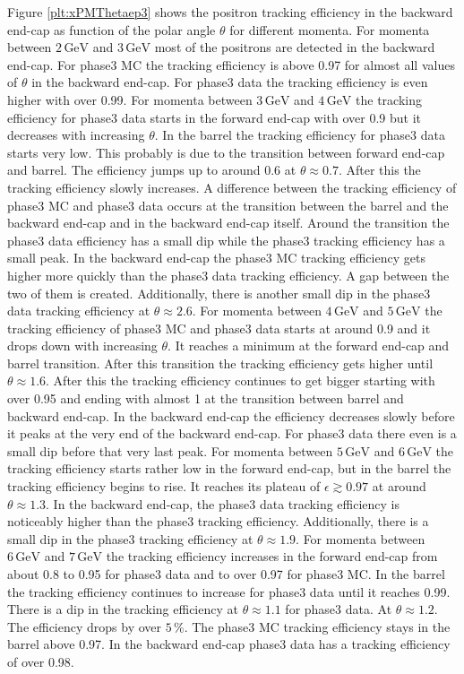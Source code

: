 \documentclass[a4paper,11pt,twosided,final,german,openbib,pdftex,listof=totoc,bibliography=totoc]{scrbook}
\begin{document}
Figure \ref{plt:xPMThetaep3} shows the positron tracking efficiency in the backward end-cap as function of the polar angle $\theta$ for different momenta.
For momenta between $2\,\textrm{GeV}$ and $3\,\textrm{GeV}$ most of the positrons are detected in the backward end-cap. For phase3 MC the tracking efficiency is above 0.97 for almost all values of $\theta$ in the backward end-cap. For phase3 data the tracking efficiency is even higher with over 0.99.
For momenta between $3\,\textrm{GeV}$ and $4\,\textrm{GeV}$ the tracking efficiency for phase3 data starts in the forward end-cap with over 0.9 but it decreases with increasing $\theta$. In the barrel the tracking efficiency for phase3 data starts very low. This probably is due to the transition between forward end-cap and barrel. The efficiency jumps up to around 0.6 at $\theta \approx 0.7$. After this the tracking efficiency slowly increases. A difference between the tracking efficiency of phase3 MC and phase3 data occurs at the transition between the barrel and the backward end-cap and in the backward end-cap itself. Around the transition the phase3 data efficiency has a small dip while the phase3 tracking efficiency has a small peak. In the backward end-cap the phase3 MC tracking efficiency gets higher more quickly than the phase3 data tracking efficiency. A gap between the two of them is created. Additionally, there is another small dip in the phase3 data tracking efficiency at $\theta \approx 2.6$. 
For momenta between $4\,\textrm{GeV}$ and $5\,\textrm{GeV}$ the tracking efficiency of phase3 MC and phase3 data starts at around 0.9 and it drops down with increasing $\theta$. It reaches a minimum at the forward end-cap and barrel transition. After this transition the tracking efficiency gets higher until $\theta \approx 1.6$. After this the tracking efficiency continues to get bigger starting with over 0.95 and ending with almost 1 at the transition between barrel and backward end-cap. In the backward end-cap the efficiency decreases slowly before it peaks at the very end of the backward end-cap. For phase3 data there even is a small dip before that very last peak.
For momenta between $5\,\textrm{GeV}$ and $6\,\textrm{GeV}$ the tracking efficiency starts rather low in the forward end-cap, but in the barrel the tracking efficiency begins to rise. It reaches its plateau of $\epsilon \gtrsim 0.97$ at around $\theta \approx 1.3$. In the backward end-cap, the phase3 data tracking efficiency is noticeably higher than the phase3 tracking efficiency. Additionally, there is a small dip in the phase3 tracking efficiency at $\theta \approx 1.9$. 
For momenta between $6\,\textrm{GeV}$ and $7\,\textrm{GeV}$ the tracking efficiency increases in the forward end-cap from  about 0.8 to 0.95 for phase3 data and to over 0.97 for phase3 MC. In the barrel the tracking efficiency continues to increase for phase3 data until it reaches 0.99. There is a dip in the tracking efficiency at $\theta \approx 1.1$ for phase3 data. At $\theta \approx 1.2$. The efficiency drops by over $5\,\%$. The phase3 MC tracking efficiency stays in the barrel above 0.97. In the backward end-cap phase3 data has a tracking efficiency of over 0.98.
\end{document}
